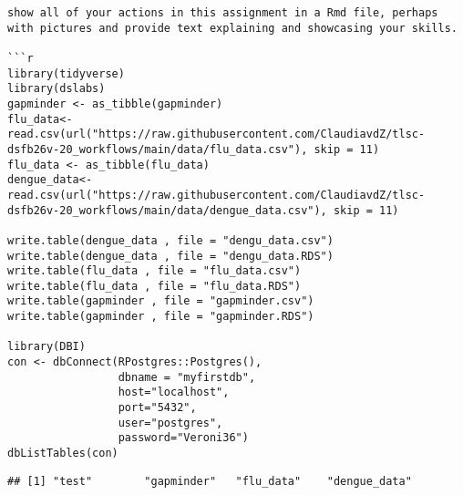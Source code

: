 \documentclass[
]{book}
\begin{document}
\begin{verbatim}
show all of your actions in this assignment in a Rmd file, perhaps with pictures and provide text explaining and showcasing your skills.

```r
library(tidyverse)
library(dslabs)
gapminder <- as_tibble(gapminder)
flu_data<- read.csv(url("https://raw.githubusercontent.com/ClaudiavdZ/tlsc-dsfb26v-20_workflows/main/data/flu_data.csv"), skip = 11)
flu_data <- as_tibble(flu_data)
dengue_data<- read.csv(url("https://raw.githubusercontent.com/ClaudiavdZ/tlsc-dsfb26v-20_workflows/main/data/dengue_data.csv"), skip = 11)

write.table(dengue_data , file = "dengu_data.csv")
write.table(dengue_data , file = "dengu_data.RDS")
write.table(flu_data , file = "flu_data.csv")
write.table(flu_data , file = "flu_data.RDS")
write.table(gapminder , file = "gapminder.csv")
write.table(gapminder , file = "gapminder.RDS")

library(DBI)
con <- dbConnect(RPostgres::Postgres(), 
                 dbname = "myfirstdb", 
                 host="localhost", 
                 port="5432", 
                 user="postgres", 
                 password="Veroni36") 
dbListTables(con) 
\end{verbatim}

\begin{verbatim}
## [1] "test"        "gapminder"   "flu_data"    "dengue_data"
\end{verbatim}
\end{document}
